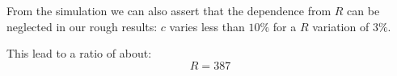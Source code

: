 \documentclass[main.tex]{subfiles}
\begin{document}
From the simulation we can also assert that the dependence from $R$ can be neglected in our rough results: $c$ varies less than $10\%$ for a $R$ variation of $3\%$.

This lead to a ratio of about:
\begin{equation}
  R = 387
\end{equation}


\end{document}
